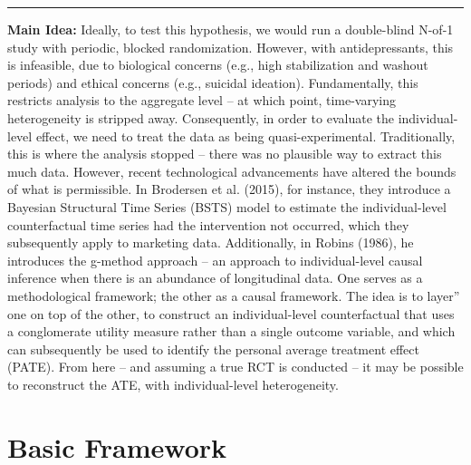 \documentclass[12pt,letterpaper,doublespace, oneside]{article}
\begin{document}
\noindent\rule{\linewidth}{0.4pt}

\noindent


\noindent\textbf{Main Idea:}
Ideally, to test this hypothesis, we would run a double-blind N-of-1 study with periodic, blocked randomization. However, with antidepressants, this is infeasible, due to biological concerns (e.g., high stabilization and washout periods) and ethical concerns (e.g., suicidal ideation). Fundamentally, this restricts analysis to the aggregate level -- at which point, time-varying heterogeneity is stripped away. Consequently, in order to evaluate the individual-level effect, we need to treat the data as being quasi-experimental. Traditionally, this is where the analysis stopped -- there was no plausible way to extract this much data. However, recent technological advancements have altered the bounds of what is permissible. In Brodersen et al. (2015), for instance, they introduce a Bayesian Structural Time Series (BSTS) model to estimate the individual-level counterfactual time series had the intervention not occurred, which they subsequently apply to marketing data. Additionally, in Robins (1986), he introduces the g-method approach -- an approach to individual-level causal inference when there is an abundance of longitudinal data. One serves as a methodological framework; the other as a causal framework. The idea is to layer'' one on top of the other, to construct an individual-level counterfactual that uses a conglomerate utility measure rather than a single outcome variable, and which can subsequently be used to identify the personal average treatment effect (PATE). From here -- and assuming a true RCT is conducted -- it may be possible to reconstruct the ATE, with individual-level heterogeneity. 


\newpage
\section{Basic Framework}
\end{document}
